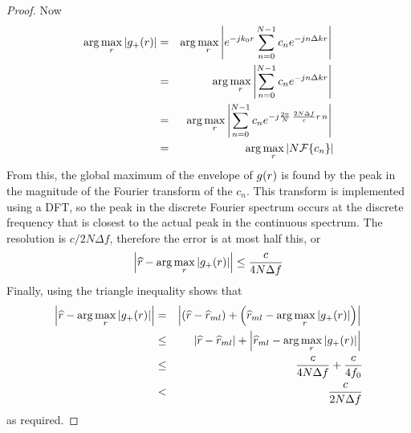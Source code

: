 \begin{proof}
Now
\begin{eqnarray}
\arg\max_{{r}}\left|g_{+}({r})\right|
&=&\arg\max_{{r}}\left|{e^{-jk_0{r}}}\sum_{n=0}^{N-1}c_n{e^{-jn\Delta k{r}}}\right|{\nonumber}\\
&=&\arg\max_{{r}}\left|\sum_{n=0}^{N-1}c_n{e^{-jn\Delta k{r}}}\right|{\nonumber}\\
&=&\arg\max_{{r}}\left|\sum_{n=0}^{N-1}c_n
{e^{-j\frac{2\pi}{N}\,\frac{2N\Delta f}{c}{r}\,n}}\right|{\nonumber}\\
&=&\arg\max_{{r}}\left|N{\cal F}\{c_n\}\right|
\end{eqnarray}
From this, the global maximum of the envelope of $g({r})$ is found by the
peak in the magnitude of the Fourier transform of the $c_n$.  
This transform is implemented using a DFT, so the peak in
the discrete Fourier spectrum occurs at the discrete frequency that is
closest to the actual peak in the continuous spectrum.  The resolution is
$c/2N\Delta f$, therefore the error is at most half this, or
\begin{equation}
\left|\widehat{r}-\arg\max_{{r}}\left|g_{+}({r})\right|\right|\leq\frac{c}{4N\Delta f}
\end{equation}
Finally, using the triangle inequality shows that
\begin{eqnarray}
\left|\widehat{r}-\arg\max_{{r}}\left|g_{+}({r})\right|\right|
&=&\left|\left(\widehat{r}-\widehat{r}_{ml}\right)+\left(\widehat{r}_{ml}-
\arg\max_{{r}}\left|g_{+}({r})\right|\right)\right|{\nonumber}\\
&\leq&\left|\widehat{r}-\widehat{r}_{ml}\right|
	+\left|\widehat{r}_{ml}-\arg\max_{{r}}\left|g_{+}({r})\right|\right|{\nonumber}\\
&\leq&\frac{c}{4N\Delta f}+\frac{c}{4f_0}{\nonumber}\\
&<&\frac{c}{2N\Delta f}
\end{eqnarray}
as required.
\end{proof}

\label{ee app:min with cm}

